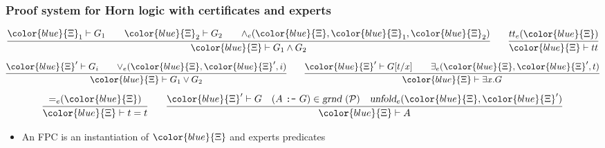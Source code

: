 \documentclass{beamer}
\newcommand{\red}[1]{{\color{red} #1}}
\newcommand{\trueExpert }[1]{{\true_e}(#1)}
\newcommand{\eqExpert }[1]{{=_e}(#1)}
\newcommand{\unfoldExpert}[2]{{\hbox{\sl unfold}_e}(#1,#2)}
\newcommand{\andExpert}[3]{{\wedge_e}(#1,#2,#3)}
\newcommand{\orExpert  }[3]{{\vee_e}(#1,#2,#3)}
\newcommand{\someExpert}[3]{\exists_e(#1,#2,#3)}
\newcommand{\true}{tt}
\newcommand{\XXi}{{\color{blue}{\Xi}}}
\begin{document}
\newcommand{\instan}[1]{\hbox{\sl grnd}~(#1)}
\newcommand{\Pscr}{{\mathcal P}}
%
\begin{frame}
  \frametitle{Proof system for Horn logic with certificates and experts}

\[
\infer{\XXi\vdash G_1\wedge G_2}
      {\XXi_1\vdash G_1\qquad \XXi_2\vdash G_2\qquad \andExpert{\XXi}{\XXi_1}{\XXi_2}}
\qquad
\infer{\XXi\vdash \true}
      {\trueExpert{\XXi}}
\]
\vskip -6pt
\[
\infer{\XXi\vdash G_1\vee G_2}
      {\XXi'\vdash G_i\qquad \orExpert{\XXi}{\XXi'}{i}}
\qquad
\infer{\XXi\vdash \exists x. G}
      {\XXi'\vdash G[t/x]\qquad \someExpert{\XXi}{\XXi'}{t}}
\]
\vskip -6pt
\[
\infer{\XXi\vdash t = t}
      {\eqExpert{\XXi}}
\qquad
\infer{\XXi\vdash A}
      {\XXi'\vdash G \quad (A~\hbox{\tt :-}~G)\in\instan\Pscr
                     \quad \unfoldExpert{\XXi}{\XXi'}}
\]
\begin{itemize}
\item An FPC is an instantiation of $\XXi$ and experts predicates
\end{itemize}
\end{frame}
\end{document}
